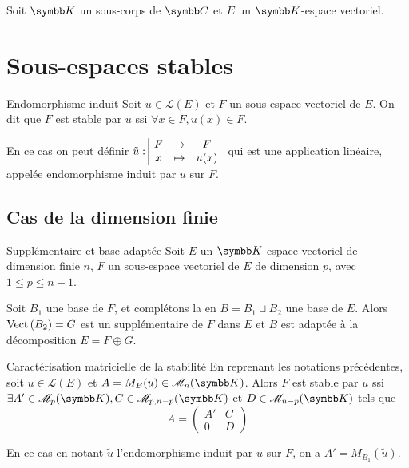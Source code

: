 Soit $\K$ un sous-corps de $\C$ et $E$ un $\K$-espace vectoriel.
 
\section{Sous-espaces stables}

\begin{definition}{Endomorphisme induit}{}
    Soit $u \in \mathscr L(E)$ et $F$ un sous-espace vectoriel de $E$. On dit que 
    $F$ est stable par $u$ ssi $\forall x \in F, u(x) \in F$.

    En ce cas on peut définir $\tilde u: \space \begin{array}{|ccc} \displaystyle F & \to & \displaystyle F \\ \displaystyle x & \mapsto & \displaystyle u(x) \end{array}$ qui est une application 
    linéaire, appelée endomorphisme induit par $u$ sur $F$.
\end{definition}

\subsection{Cas de la dimension finie}

\begin{proposition}{Supplémentaire et base adaptée}{}
    Soit $E$ un $\K$-espace vectoriel de dimension finie $n$, $F$ un sous-espace vectoriel de $E$
    de dimension $p$, avec $1 \leqslant p \leqslant n - 1$. 

    Soit $B_1$ une base de $F$, et complétons la en $B = B_1 \sqcup B_2$ une base de $E$. Alors 
    $\operatorname{Vect} \, (B_2) = G$ est un supplémentaire de $F$ dans $E$ et 
    $B$ est adaptée à la décomposition $E = F \oplus G$.

\end{proposition}

\begin{proposition}{Caractérisation matricielle de la stabilité}{}
    En reprenant les notations précédentes, soit $u \in \mathscr L(E)$ et $A = M_B(u) \in \mathscr M_n(\K)$. 
    Alors $F$ est stable par $u$ ssi 
    $\exists A' \in \mathscr M_{p}(\K), C \in \mathscr M_{p, n - p}(\K)$ et $D \in \mathscr M_{n - p}(\K)$ tels que
    \[
        A = \begin{pmatrix}
            A' & C \\
            0 & D
        \end{pmatrix}
    \]

    En ce cas en notant $\tilde u$ l'endomorphisme induit par $u$ sur $F$, on a $A' = M_{B_1}(\tilde u)$.
\end{proposition}

